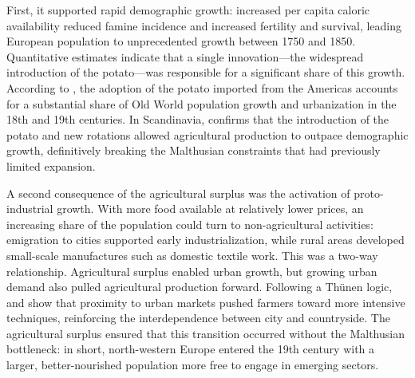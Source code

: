 \documentclass[11pt,a4paper]{article}
\begin{document}
First, it supported rapid demographic growth: increased per capita caloric availability reduced famine incidence and increased fertility and survival, leading European population to unprecedented growth between 1750 and 1850. Quantitative estimates indicate that a single innovation---the widespread introduction of the potato---was responsible for a significant share of this growth. According to \textcite{NunnQian2011}, the adoption of the potato imported from the Americas accounts for a substantial share of Old World population growth and urbanization in the 18th and 19th centuries. In Scandinavia, \textcite{Skoglund2023} confirms that the introduction of the potato and new rotations allowed agricultural production to outpace demographic growth, definitively breaking the Malthusian constraints that had previously limited expansion.

A second consequence of the agricultural surplus was the activation of proto-industrial growth. With more food available at relatively lower prices, an increasing share of the population could turn to non-agricultural activities: emigration to cities supported early industrialization, while rural areas developed small-scale manufactures such as domestic textile work. This was a two-way relationship. Agricultural surplus enabled urban growth, but growing urban demand also pulled agricultural production forward. Following a Thünen logic, \textcite{KopsidisWolf2012} and \textcite{Pfister2022} show that proximity to urban markets pushed farmers toward more intensive techniques, reinforcing the interdependence between city and countryside. The agricultural surplus ensured that this transition occurred without the Malthusian bottleneck: in short, north-western Europe entered the 19th century with a larger, better-nourished population more free to engage in emerging sectors.
\end{document}
